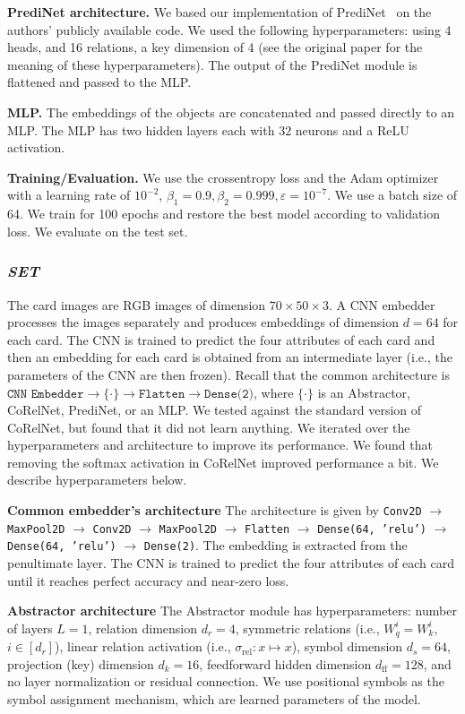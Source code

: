 \textbf{PrediNet architecture.} We based our implementation of PrediNet~\citep{shanahanExplicitlyRelationalNeural} on the authors' publicly available code. We used the following hyperparameters: using 4 heads, and 16 relations, a key dimension of 4 (see the original paper for the meaning of these hyperparameters). The output of the PrediNet module is flattened and passed to the MLP.

\textbf{MLP.} The embeddings of the objects are concatenated and passed directly to an MLP. The MLP has two hidden layers each with $32$ neurons and a ReLU activation.

\textbf{Training/Evaluation.} We use the crossentropy loss and the Adam optimizer with a learning rate of $10^{-2}$, $\beta_1 = 0.9, \beta_2 = 0.999, \varepsilon = 10^{-7}$. We use a batch size of 64. We train for 100 epochs and restore the best model according to validation loss. We evaluate on the test set.

\subsubsection{\textit{SET}}

The card images are RGB images of dimension $70 \times 50 \times 3$. A CNN embedder processes the images separately and produces embeddings of dimension $d=64$ for each card. The CNN is trained to predict the four attributes of each card and then an embedding for each card is obtained from an intermediate layer (i.e., the parameters of the CNN are then frozen). Recall that the common architecture is $\texttt{CNN Embedder} \to \{\cdot\} \to \texttt{Flatten} \to \texttt{Dense(2)}$, where $\{\cdot\}$ is an Abstractor, CoRelNet, PrediNet, or an MLP. We tested against the standard version of CoRelNet, but found that it did not learn anything. We iterated over the hyperparameters and architecture to improve its performance. We found that removing the softmax activation in CoRelNet improved performance a bit. We describe hyperparameters below.

\textbf{Common embedder's architecture} The architecture is given by \texttt{Conv2D} $\to$ \texttt{MaxPool2D} $\to$ \texttt{Conv2D} $\to$ \texttt{MaxPool2D} $\to$ \texttt{Flatten} $\to$ \texttt{Dense(64, 'relu')} $\to$ \texttt{Dense(64, 'relu')} $\to$ \texttt{Dense(2)}. The embedding is extracted from the penultimate layer. The CNN is trained to predict the four attributes of each card until it reaches perfect accuracy and near-zero loss.

\textbf{Abstractor architecture}
The Abstractor module has hyperparameters: number of layers $L = 1$, relation dimension $d_r = 4$, symmetric relations (i.e., $W_q^{i} = W_k^{i}$, $i \in [d_r]$), linear relation activation (i.e., $\sigma_{\mathrm{rel}}: x \mapsto x$), symbol dimension $d_s = 64$, projection (key) dimension $d_k = 16$, feedforward hidden dimension $d_{\mathrm{ff}} = 128$, and no layer normalization or residual connection. We use positional symbols as the symbol assignment mechanism, which are learned parameters of the model.


